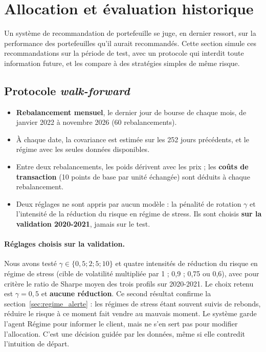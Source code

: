 \section{Allocation et évaluation historique}
\label{sec:allocation_backtest}

Un système de recommandation de portefeuille se juge, en dernier ressort, sur la performance des portefeuilles qu'il aurait recommandés. Cette section simule ces recommandations sur la période de test, avec un protocole qui interdit toute information future, et les compare à des stratégies simples de même risque.

\subsection{Protocole \emph{walk-forward}}

\begin{itemize}
  \item \textbf{Rebalancement mensuel}, le dernier jour de bourse de chaque mois, de janvier 2022 à novembre 2026 (60 rebalancements).
  \item À chaque date, la covariance est estimée sur les 252 jours précédents, et le régime avec les seules données disponibles.
  \item Entre deux rebalancements, les poids dérivent avec les prix ; les \textbf{coûts de transaction} (10 points de base par unité échangée) sont déduits à chaque rebalancement.
  \item Deux réglages ne sont appris par aucun modèle : la pénalité de rotation $\gamma$ et l'intensité de la réduction du risque en régime de stress. Ils sont choisis \textbf{sur la validation 2020-2021}, jamais sur le test.
\end{itemize}

\paragraph{Réglages choisis sur la validation.} Nous avons testé $\gamma \in \{0{,}5 ; 2 ; 5 ; 10\}$ et quatre intensités de réduction du risque en régime de stress (cible de volatilité multipliée par 1 ; 0,9 ; 0,75 ou 0,6), avec pour critère le ratio de Sharpe moyen des trois profils sur 2020-2021. Le choix retenu est $\gamma = 0{,}5$ et \textbf{aucune réduction}. Ce second résultat confirme la section~\ref{sec:regime_alerte} : les régimes de stress étant souvent suivis de rebonds, réduire le risque à ce moment fait vendre au mauvais moment. Le système garde l'agent Régime pour informer le client, mais ne s'en sert pas pour modifier l'allocation. C'est une décision guidée par les données, même si elle contredit l'intuition de départ.

